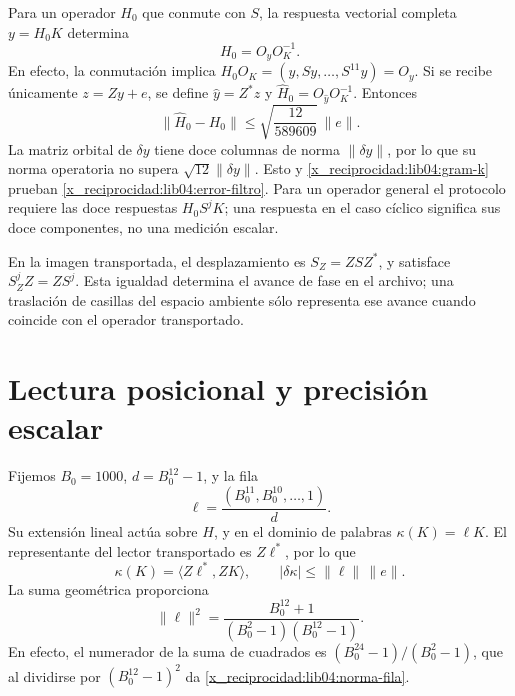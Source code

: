 Para un operador \(H_0\) que conmute con \(S\), la respuesta
vectorial completa \(y=H_0K\) determina
\begin{equation}
 H_0=O_yO_K^{-1}.
 \label{x_reciprocidad:lib04:identificacion-filtro}
\end{equation}
En efecto, la conmutación implica
\(H_0O_K=(y,Sy,\ldots,S^{11}y)=O_y\). Si se recibe únicamente
\(z=Zy+e\), se define \(\widehat y=Z^*z\) y
\(\widehat H_0=O_{\widehat y}O_K^{-1}\). Entonces
\begin{equation}
 \|\widehat H_0-H_0\|
 \leq\sqrt{\frac{12}{589609}}\,\|e\|.
 \label{x_reciprocidad:lib04:error-filtro}
\end{equation}
La matriz orbital de \(\delta y\) tiene doce columnas de norma
\(\|\delta y\|\), por lo que su norma operatoria no supera
\(\sqrt{12}\|\delta y\|\). Esto y
\eqref{x_reciprocidad:lib04:gram-k} prueban \eqref{x_reciprocidad:lib04:error-filtro}.
Para un operador general el protocolo requiere las doce respuestas
\(H_0S^jK\); una respuesta en el caso cíclico significa sus doce
componentes, no una medición escalar.

En la imagen transportada, el desplazamiento es
\(S_Z=ZSZ^*\), y satisface \(S_Z^jZ=ZS^j\). Esta igualdad
determina el avance de fase en el archivo; una traslación de casillas
del espacio ambiente sólo representa ese avance cuando coincide con
el operador transportado.

\section{Lectura posicional y precisión escalar}
\label{x_reciprocidad:lib04:kappa}

Fijemos \(B_0=1000\), \(d=B_0^{12}-1\), y la fila
\begin{equation}
 \ell=\frac{(B_0^{11},B_0^{10},\ldots,1)}{d}.
 \label{x_reciprocidad:lib04:fila-posicional}
\end{equation}
Su extensión lineal actúa sobre \(H\), y en el dominio de palabras
\(\kappa(K)=\ell K\). El representante del lector transportado es
\(Z\ell^*\), por lo que
\begin{equation}
 \kappa(K)=\langle Z\ell^*,ZK\rangle,\qquad
 |\delta\kappa|\leq\|\ell\|\,\|e\|.
 \label{x_reciprocidad:lib04:lectura-kappa}
\end{equation}
La suma geométrica proporciona
\begin{equation}
 \|\ell\|^2
 =\frac{B_0^{12}+1}{(B_0^2-1)(B_0^{12}-1)}.
 \label{x_reciprocidad:lib04:norma-fila}
\end{equation}
En efecto, el numerador de la suma de cuadrados es
\((B_0^{24}-1)/(B_0^2-1)\), que al dividirse por
\((B_0^{12}-1)^2\) da \eqref{x_reciprocidad:lib04:norma-fila}.

